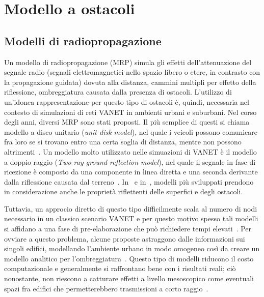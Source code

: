 
\chapter{Modello a ostacoli}\label{chap:modello-a-ostacoli}
%
\section{Modelli di radiopropagazione}\label{sec:modelli-propagazione}
Un modello di radiopropagazione (MRP) simula gli effetti dell'attenuazione del segnale radio (segnali elettromagnetici nello spazio libero o etere, in contrasto con la propagazione guidata)
dovuta alla distanza, cammini multipli per effetto della riflessione, ombreggiatura causata dalla presenza di ostacoli.
L'utilizzo di un'idonea rappresentazione per questo tipo di ostacoli è, quindi, necessaria nel contesto di simulazioni di reti VANET in ambienti urbani
e suburbani.
Nel corso degli anni, diversi MRP sono stati proposti.
Il più semplice di questi si chiama modello a disco unitario (\textit{unit-disk model}), nel quale i veicoli possono comunicare fra loro se si trovano entro una certa soglia
di distanza, mentre non possono altrimenti~\cite{6554832}.
Un modello molto utilizzato nelle simuazioni di VANET è il modello a doppio raggio (\textit{Two-ray ground-reflection model}),
nel quale il segnale in fase di ricezione è composto da una componente in linea diretta e una seconda derivante dalla riflessione causata dal terreno~\cite{DBLP:books/daglib/0091821}.
In~\cite{Schmitz:2006:ERW:1164717.1164730} e in~\cite{Souley2005RealisticUS}, modelli più sviluppati prendono in considerazione anche le proprietà riflettenti delle superfici e degli ostacoli.

Tuttavia, un approcio diretto di questo tipo difficilmente scala al numero di nodi necessario in un classico scenario VANET e per questo motivo
spesso tali modelli si affidano a una fase di pre-elaborazione che può richiedere tempi elevati~\cite{Stepanov:2008:IMR:1293378.1293656}.
Per ovviare a questo problema, alcune proposte astraggono dalle informazioni sui singoli edifici, modellando l'ambiente urbano in modo omogeneo
così da creare un modello analitico per l'ombreggiatura~\cite{1492678}.
Questo tipo di modelli riducono il costo computazionale e generalmente si raffrontano bene con i risultati reali;
ciò nonostante, non riescono a catturare effetti a livello mesoscopico come eventuali spazi fra edifici che permetterebbero trasmissioni a corto raggio~\cite{Giordano:2010:CST:1860058.1860065}.

